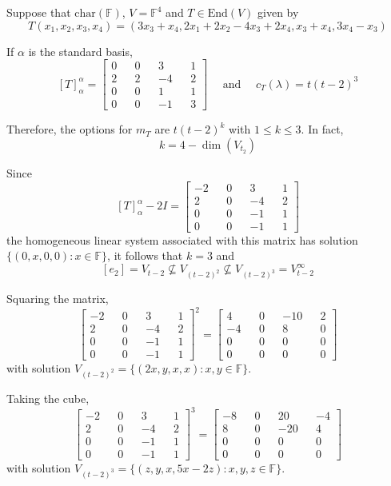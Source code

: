 \begin{example}
	Suppose that $\text{char}(\mathbb{F})$, $V = \mathbb{F}^4$ and $T \in \text{End}(V)$ given by 
	\[
		T(x_1, x_2, x_3, x_4) = (3x_3 + x_4, 2x_1+2x_2 - 4x_3 + 2 x_4, x_3 + x_4, 3x_4 - x_3)
	\]
	
	If $\alpha$ is the standard basis,
	\[
		[T]_\alpha^\alpha = \begin{bmatrix}
		0 && 0 && 3 && 1 \\
		2 && 2 && -4 && 2 \\
		0 && 0 && 1 && 1 \\
		0 && 0 && -1 && 3
		\end{bmatrix}
		\quad \text{ and } \quad c_T(\lambda) = t(t-2)^3
	\]
	
	Therefore, the options for $m_T$ are $t(t-2)^k$ with $1 \leq k \leq 3$. In fact,
	\[
		k = 4 - \dim(V_{t_2})
	\]
	
	Since
	\[
		[T]_\alpha^\alpha - 2I = \begin{bmatrix}
		-2 && 0 && 3 && 1 \\
		2 && 0 && -4 && 2 \\
		0 && 0 && -1 && 1 \\
		0 && 0 && -1 && 1
		\end{bmatrix}
	\]
	the homogeneous linear system associated with this matrix has solution $\{ (0, x, 0, 0) : x \in \mathbb{F} \}$, it follows that $k = 3$ and 
	\[
		[e_2] = V_{t-2} \not\subseteq V_{(t-2)^2} \not\subseteq V_{(t-2)^3} = V_{t-2}^\infty
	\]
	
	Squaring the matrix,
	\[
		\begin{bmatrix}
		-2 && 0 && 3 && 1 \\
		2 && 0 && -4 && 2 \\
		0 && 0 && -1 && 1 \\
		0 && 0 && -1 && 1
		\end{bmatrix}^2
		= \begin{bmatrix}
		4 && 0 && -10 && 2 \\
		-4 && 0 && 8 && 0 \\
		0 && 0 && 0 && 0 \\
		0 && 0 && 0 && 0
		\end{bmatrix}
	\]
	with solution $V_{(t-2)^2} = \{ (2x, y, x, x) : x, y \in \mathbb{F} \}$.
	
	Taking the cube,
	\[
		\begin{bmatrix}
		-2 && 0 && 3 && 1 \\
		2 && 0 && -4 && 2 \\
		0 && 0 && -1 && 1 \\
		0 && 0 && -1 && 1
		\end{bmatrix}^3
		= \begin{bmatrix}
		-8 && 0 && 20 && -4 \\
		8 && 0 && -20 && 4 \\
		0 && 0 && 0 && 0 \\
		0 && 0 && 0 && 0
		\end{bmatrix}
	\]
	with solution $V_{(t-2)^3} = \{ (z, y, x, 5x-2z) : x, y, z \in \mathbb{F} \}$.
\end{example}

%	

